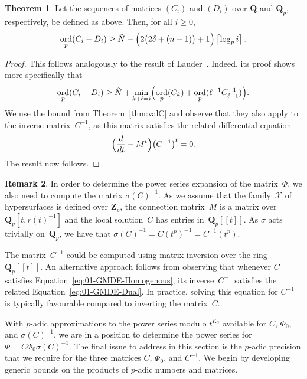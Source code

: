 \documentclass[a4paper,11pt]{article}
\numberwithin{equation}{section}
\providecommand{\ceil}[1]{\left\lceil#1\right\rceil}   %
\DeclareMathOperator{\ord}{ord}          %
\theoremstyle{definition}
\newtheorem{thm}{Theorem}[section]
\newtheorem{rem}[thm]{Remark}
\begin{document}
\begin{thm}
Let the sequences of matrices $(C_i)$ and $(D_i)$ over $\mathbf{Q}$ and 
$\mathbf{Q}_p$, respectively, be defined as above.  Then, for all $i \geq 0$, 
\begin{equation*}
\ord_p(C_i - D_i) \geq 
    \tilde{N} - \Bigl(2 \bigl(2 \delta + (n-1)\bigr) + 1\Bigr) \ceil{\log_p i}.
\end{equation*}
\end{thm}

\begin{proof}
This follows analogously to the result of 
Lauder~\citep[Theorem~5.1]{Lauder2006}.  
Indeed, its proof shows more specifically that 
\begin{equation}
\ord_p(C_i - D_i) \geq 
    \tilde{N} + \min_{k+\ell=i} \Bigl(\ord_p(C_k) + 
                                      \ord_p(\ell^{-1} C_{\ell-1}^{-1})\Bigr).
\end{equation}
We use the bound from Theorem~\ref{thm:valC} and observe that they 
also apply to the inverse matrix~$C^{-1}$, as this matrix satisfies 
the related differential equation 
\begin{equation} \label{eq:01-GMDE-Dual}
\Bigl(\frac{d}{dt} - M^t\Bigr) \bigl(C^{-1}\bigr)^t = 0.
\end{equation}
The result now follows.
\end{proof}

\begin{rem}
In order to determine the power series expansion of the matrix~$\Phi$, 
we also need to compute the matrix $\sigma(C)^{-1}$.  As we assume that 
the family~$\mathcal{X}$ of hypersurfaces is defined over $\mathbf{Z}_p$, 
the connection matrix~$M$ is a matrix over $\mathbf{Q}_p[t,r(t)^{-1}]$ 
and the local solution~$C$ has entries in~$\mathbf{Q}_p[[t]]$.  
As $\sigma$ acts trivially on~$\mathbf{Q}_p$, we have that 
$\sigma(C)^{-1} = C(t^p)^{-1} = C^{-1}(t^p)$. 

The matrix~$C^{-1}$ could be computed using matrix inversion 
over the ring $\mathbf{Q}_p[[t]]$.  An alternative approach 
follows from observing that whenever $C$ satisfies 
Equation~\eqref{eq:01-GMDE-Homogenous}, its inverse~$C^{-1}$ 
satisfies the related Equation~\eqref{eq:01-GMDE-Dual}. 
In practice, solving this equation for $C^{-1}$ is typically favourable 
compared to inverting the matrix~$C$.
\end{rem}

With $p$-adic approximations to the power series modulo $t^{K_2}$ available 
for $C$, $\Phi_0$, and $\sigma(C)^{-1}$, we are in a position to determine 
the power series for $\Phi = C \Phi_0 \sigma(C)^{-1}$.  The final issue 
to address in this section is the $p$-adic precision that we require for 
the three matrices $C$, $\Phi_0$, and $C^{-1}$.
We begin by developing generic bounds on the products of $p$-adic numbers 
and matrices.
\end{document}
